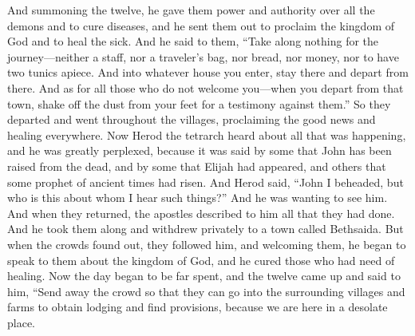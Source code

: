 \begin{biblechapter} %
 And summoning the twelve, he gave them power and authority over all the demons and to cure diseases,
\verse and he sent them out to proclaim the kingdom of God and to heal the sick.
\verse And he said to them, “Take along nothing for the journey—neither a staff, nor a traveler’s bag, nor bread, nor money, nor to have two tunics apiece.
\verse And into whatever house you enter, stay there and depart from there.
\verse And as for all those who do not welcome you—when you depart from that town, shake off the dust from your feet for a testimony against them.”
\verse So they departed and went throughout the villages, proclaiming the good news and healing everywhere.
 Now Herod the tetrarch heard about all that was happening, and he was greatly perplexed, because it was said by some that John has been raised from the dead,
\verse and by some that Elijah had appeared, and others that some prophet of ancient times had risen.
\verse And Herod said, “John I beheaded, but who is this about whom I hear such things?” And he was wanting to see him.
 And when they returned, the apostles described to him all that they had done. And he took them along and withdrew privately to a town called Bethsaida.
\verse But when the crowds found out, they followed him, and welcoming them, he began to speak to them about the kingdom of God, and he cured those who had need of healing.
\verse Now the day began to be far spent, and the twelve came up and said to him, “Send away the crowd so that they can go into the surrounding villages and farms to obtain lodging and find provisions, because we are here in a desolate place.

\end{biblechapter}
